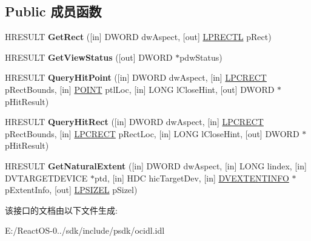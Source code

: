 \subsection*{Public 成员函数}
\begin{DoxyCompactItemize}
\item 
\mbox{\label{interface_i_view_object_ex_ad3bc2948aeeb6f69c7e8ca7ec4e973bc}} 
H\+R\+E\+S\+U\+LT {\bfseries Get\+Rect} (\mbox{[}in\mbox{]} D\+W\+O\+RD dw\+Aspect, \mbox{[}out\mbox{]} \hyperlink{struct___r_e_c_t_l}{L\+P\+R\+E\+C\+TL} p\+Rect)
\item 
\mbox{\label{interface_i_view_object_ex_a02ee44feb64d6bceed10fc4d875fdc96}} 
H\+R\+E\+S\+U\+LT {\bfseries Get\+View\+Status} (\mbox{[}out\mbox{]} D\+W\+O\+RD $\ast$pdw\+Status)
\item 
\mbox{\label{interface_i_view_object_ex_af405a11e6212b570a08ac14c7d74a640}} 
H\+R\+E\+S\+U\+LT {\bfseries Query\+Hit\+Point} (\mbox{[}in\mbox{]} D\+W\+O\+RD dw\+Aspect, \mbox{[}in\mbox{]} \hyperlink{structtag_r_e_c_t}{L\+P\+C\+R\+E\+CT} p\+Rect\+Bounds, \mbox{[}in\mbox{]} \hyperlink{structtag_p_o_i_n_t}{P\+O\+I\+NT} ptl\+Loc, \mbox{[}in\mbox{]} L\+O\+NG l\+Close\+Hint, \mbox{[}out\mbox{]} D\+W\+O\+RD $\ast$p\+Hit\+Result)
\item 
\mbox{\label{interface_i_view_object_ex_a19528c621a371996eee749e782589992}} 
H\+R\+E\+S\+U\+LT {\bfseries Query\+Hit\+Rect} (\mbox{[}in\mbox{]} D\+W\+O\+RD dw\+Aspect, \mbox{[}in\mbox{]} \hyperlink{structtag_r_e_c_t}{L\+P\+C\+R\+E\+CT} p\+Rect\+Bounds, \mbox{[}in\mbox{]} \hyperlink{structtag_r_e_c_t}{L\+P\+C\+R\+E\+CT} p\+Rect\+Loc, \mbox{[}in\mbox{]} L\+O\+NG l\+Close\+Hint, \mbox{[}out\mbox{]} D\+W\+O\+RD $\ast$p\+Hit\+Result)
\item 
\mbox{\label{interface_i_view_object_ex_a7b25e17b65185d3cea1541f5ed0739a8}} 
H\+R\+E\+S\+U\+LT {\bfseries Get\+Natural\+Extent} (\mbox{[}in\mbox{]} D\+W\+O\+RD dw\+Aspect, \mbox{[}in\mbox{]} L\+O\+NG lindex, \mbox{[}in\mbox{]} D\+V\+T\+A\+R\+G\+E\+T\+D\+E\+V\+I\+CE $\ast$ptd, \mbox{[}in\mbox{]} H\+DC hic\+Target\+Dev, \mbox{[}in\mbox{]} \hyperlink{struct_i_view_object_ex_1_1tag_extent_info}{D\+V\+E\+X\+T\+E\+N\+T\+I\+N\+FO} $\ast$p\+Extent\+Info, \mbox{[}out\mbox{]} \hyperlink{structtag_s_i_z_e}{L\+P\+S\+I\+Z\+EL} p\+Sizel)
\end{DoxyCompactItemize}


该接口的文档由以下文件生成\+:\begin{DoxyCompactItemize}
\item 
E\+:/\+React\+O\+S-\/0../sdk/include/psdk/ocidl.\+idl\end{DoxyCompactItemize}
